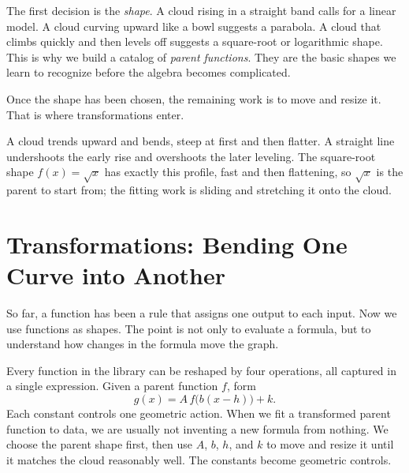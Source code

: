\documentclass[12pt]{book}
\begin{document}
The first decision is the \emph{shape}. A cloud rising in a straight band calls for a
linear model. A cloud curving upward like a bowl suggests a parabola. A cloud that
climbs quickly and then levels off suggests a square-root or logarithmic shape. This
is why we build a catalog of \emph{parent functions}. They are the basic shapes we
learn to recognize before the algebra becomes complicated.

Once the shape has been chosen, the remaining work is to move and resize it. That is
where transformations enter.


\begin{example}
A cloud trends upward and bends, steep at first and then flatter. A straight line
undershoots the early rise and overshoots the later leveling. The square-root shape
$f(x)=\sqrt{x}$ has exactly this profile, fast and then flattening, so $\sqrt{x}$ is
the parent to start from; the fitting work is sliding and stretching it onto the
cloud.
\end{example}

\section{Transformations: Bending One Curve into Another}

So far, a function has been a rule that assigns one output to each input. Now we use
functions as shapes. The point is not only to evaluate a formula, but to understand
how changes in the formula move the graph.

Every function in the library can be reshaped by four operations, all captured in a
single expression. Given a parent function $f$, form
\[
g(x)=A\,f\!\big(b(x-h)\big)+k.
\]
Each constant controls one geometric action. When we fit a transformed parent
function to data, we are usually not inventing a new formula from nothing. We choose
the parent shape first, then use $A$, $b$, $h$, and $k$ to move and resize it until it
matches the cloud reasonably well. The constants become geometric controls.
\end{document}
